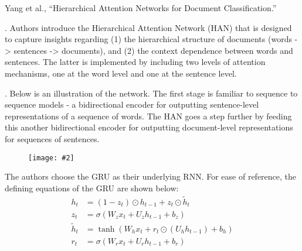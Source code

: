\documentclass[11pt]{article}
\newcommand\myfig[2][0.3\textwidth]{\begin{figure}[h!]\centering\texttt{[image: \#2]}\end{figure}}
\newcommand\myspace[1][]{\vspace{#1\bigskipamount}}
\newcommand\p{\Needspace{10\baselineskip} \noindent}
\begin{document}
\vspace{-1em}
{\footnotesize Yang et al., ``Hierarchical Attention Networks for Document Classification.''}

. Authors introduce the Hierarchical Attention Network (HAN) that is designed to capture insights regarding (1) the hierarchical structure of documents (words -> sentences -> documents), and (2) the context dependence between words and sentences. The latter is implemented by including two levels of attention mechanisms, one at the word level and one at the sentence level.

\myspace
\p {}. Below is an illustration of the network. The first stage is familiar to sequence to sequence models - a bidirectional encoder for outputting sentence-level representations of a sequence of words. The HAN goes a step further by feeding this another bidirectional encoder for outputting document-level representations for sequences of sentences. 

\myfig[0.4\textwidth]{HAN.png}

The authors choose the GRU as their underlying RNN. For ease of reference, the defining equations of the GRU are shown below:
\begin{align}
h_t &= (1 - z_t) \odot h_{t - 1} + z_t \odot \tilde h_t \\
z_t &= \sigma \left( W_z x_t + U_z h_{t - 1} + b_z \right) \\
\tilde h_t &= \tanh \left( W_h x_t + r_t \odot (U_h h_{t - 1}) + b_h \right) \\
r_t &= \sigma \left( W_r x_t + U_r h_{t - 1} + b_r \right)
\end{align}
\end{document}
